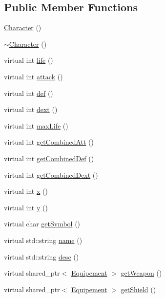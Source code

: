 \subsection*{Public Member Functions}
\begin{DoxyCompactItemize}
\item 
\hyperlink{class_character_adc27bdd255876169bad2ed0bae0cffb5}{Character} ()
\item 
\hyperlink{class_character_a9e9be564d05ded80962b2045aa70b3fc}{$\sim$\-Character} ()
\item 
virtual int \hyperlink{class_character_a6934d717d8b6ce2576becba198cadb5a}{life} ()
\item 
virtual int \hyperlink{class_character_a2366d0ed811cebbf48f47d6bc0662f3f}{attack} ()
\item 
virtual int \hyperlink{class_character_a974d3bf59cac8ae30c37fcf54f9ed629}{def} ()
\item 
virtual int \hyperlink{class_character_aea8031e9982513bf9009df8fbc777459}{dext} ()
\item 
virtual int \hyperlink{class_character_aa6cba736434265e1008907f4e9c861f4}{max\-Life} ()
\item 
virtual int \hyperlink{class_character_a2c1bc808a27d0082e3584a0d6f896028}{get\-Combined\-Att} ()
\item 
virtual int \hyperlink{class_character_ad1d09ebc955dd15aaff631607916e633}{get\-Combined\-Def} ()
\item 
virtual int \hyperlink{class_character_aea6698aa522f5dc45f08010653b144eb}{get\-Combined\-Dext} ()
\item 
virtual int \hyperlink{class_character_a172447a2db1010ed042dfdb6f8642f46}{x} ()
\item 
virtual int \hyperlink{class_character_aa1d691c246896b0131aefd51005a8341}{y} ()
\item 
virtual char \hyperlink{class_character_a82dba8b6f61c324d97968f7129fa96e7}{get\-Symbol} ()
\item 
virtual std\-::string \hyperlink{class_character_a843c88bf3324b8d9d482001abd159062}{name} ()
\item 
virtual std\-::string \hyperlink{class_character_aeb05a9fcf7e9da62329b8b5de6a7acc9}{desc} ()
\item 
virtual shared\-\_\-ptr$<$ \hyperlink{class_equipement}{Equipement} $>$ \hyperlink{class_character_a67b84cfa139de98e9bed0a7d3dd5ab8e}{get\-Weapon} ()
\item 
virtual shared\-\_\-ptr$<$ \hyperlink{class_equipement}{Equipement} $>$ \hyperlink{class_character_a87ffb6438e83aae28b77e3fc89c4324a}{get\-Shield} ()

\end{DoxyCompactItemize}
